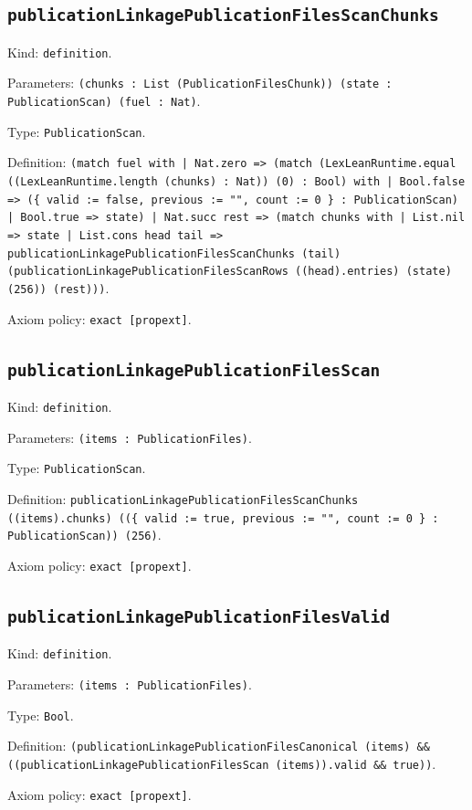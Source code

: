 \documentclass[11pt]{article}
\begin{document}
\subsection*{\texttt{publicationLinkagePublicationFilesScanChunks}}
\noindent Kind: \texttt{definition}.\par
\noindent Parameters: \texttt{(chunks : List (PublicationFilesChunk)) (state : PublicationScan) (fuel : Nat)}.\par
\noindent Type: \texttt{PublicationScan}.\par
\noindent Definition: \texttt{(match fuel with | Nat.zero => (match (LexLeanRuntime.equal ((LexLeanRuntime.length (chunks) : Nat)) (0) : Bool) with | Bool.false => (\{ valid := false, previous := "", count := 0 \} : PublicationScan) | Bool.true => state) | Nat.succ rest => (match chunks with | List.nil => state | List.cons head tail => publicationLinkagePublicationFilesScanChunks (tail) (publicationLinkagePublicationFilesScanRows ((head).entries) (state) (256)) (rest)))}.\par
\noindent Axiom policy: \texttt{exact [propext]}.\par
\subsection*{\texttt{publicationLinkagePublicationFilesScan}}
\noindent Kind: \texttt{definition}.\par
\noindent Parameters: \texttt{(items : PublicationFiles)}.\par
\noindent Type: \texttt{PublicationScan}.\par
\noindent Definition: \texttt{publicationLinkagePublicationFilesScanChunks ((items).chunks) ((\{ valid := true, previous := "", count := 0 \} : PublicationScan)) (256)}.\par
\noindent Axiom policy: \texttt{exact [propext]}.\par
\subsection*{\texttt{publicationLinkagePublicationFilesValid}}
\noindent Kind: \texttt{definition}.\par
\noindent Parameters: \texttt{(items : PublicationFiles)}.\par
\noindent Type: \texttt{Bool}.\par
\noindent Definition: \texttt{(publicationLinkagePublicationFilesCanonical (items) \&\& ((publicationLinkagePublicationFilesScan (items)).valid \&\& true))}.\par
\noindent Axiom policy: \texttt{exact [propext]}.\par
\end{document}

